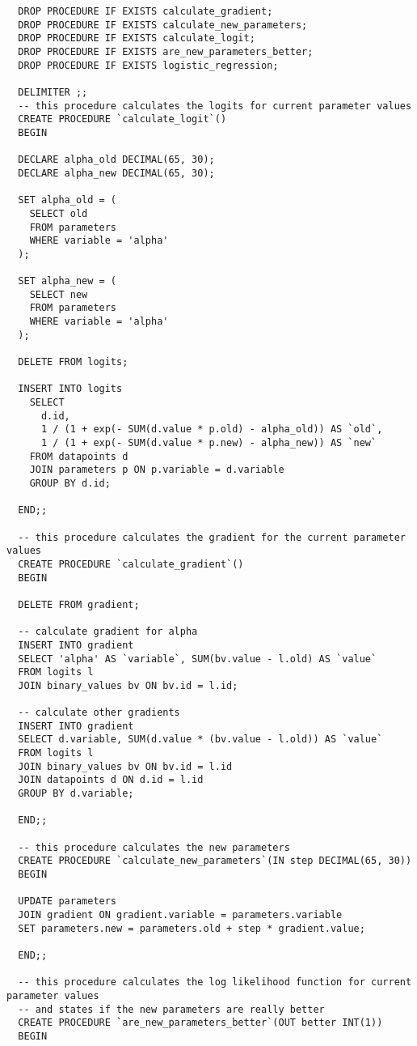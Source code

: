 \begin{verbatim}
  DROP PROCEDURE IF EXISTS calculate_gradient;
  DROP PROCEDURE IF EXISTS calculate_new_parameters;
  DROP PROCEDURE IF EXISTS calculate_logit;
  DROP PROCEDURE IF EXISTS are_new_parameters_better;
  DROP PROCEDURE IF EXISTS logistic_regression;

  DELIMITER ;;
  -- this procedure calculates the logits for current parameter values
  CREATE PROCEDURE `calculate_logit`()
  BEGIN

  DECLARE alpha_old DECIMAL(65, 30);
  DECLARE alpha_new DECIMAL(65, 30);

  SET alpha_old = (
    SELECT old
    FROM parameters
    WHERE variable = 'alpha'
  );

  SET alpha_new = (
    SELECT new
    FROM parameters
    WHERE variable = 'alpha'
  );

  DELETE FROM logits;

  INSERT INTO logits
    SELECT
      d.id,
      1 / (1 + exp(- SUM(d.value * p.old) - alpha_old)) AS `old`,
      1 / (1 + exp(- SUM(d.value * p.new) - alpha_new)) AS `new`
    FROM datapoints d
    JOIN parameters p ON p.variable = d.variable
    GROUP BY d.id;

  END;;

  -- this procedure calculates the gradient for the current parameter values
  CREATE PROCEDURE `calculate_gradient`()
  BEGIN

  DELETE FROM gradient;

  -- calculate gradient for alpha
  INSERT INTO gradient
  SELECT 'alpha' AS `variable`, SUM(bv.value - l.old) AS `value`
  FROM logits l
  JOIN binary_values bv ON bv.id = l.id;

  -- calculate other gradients
  INSERT INTO gradient
  SELECT d.variable, SUM(d.value * (bv.value - l.old)) AS `value`
  FROM logits l
  JOIN binary_values bv ON bv.id = l.id
  JOIN datapoints d ON d.id = l.id
  GROUP BY d.variable;

  END;;

  -- this procedure calculates the new parameters
  CREATE PROCEDURE `calculate_new_parameters`(IN step DECIMAL(65, 30))
  BEGIN

  UPDATE parameters
  JOIN gradient ON gradient.variable = parameters.variable
  SET parameters.new = parameters.old + step * gradient.value;

  END;;

  -- this procedure calculates the log likelihood function for current parameter values
  -- and states if the new parameters are really better
  CREATE PROCEDURE `are_new_parameters_better`(OUT better INT(1))
  BEGIN


\end{verbatim}
